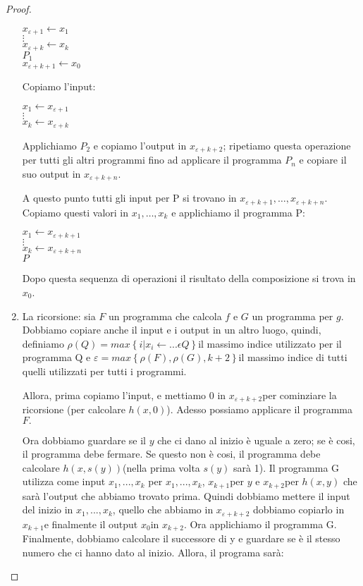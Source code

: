 \begin{proof}
\begin{enumerate}
\begin{mylisting}
$x_{\varepsilon+1}\leftarrow x_{1}$\\
$\vdots$\\
$x_{\varepsilon+k}\leftarrow x_{k}$\\
$P_{1}$\\
$x_{\varepsilon+k+1}\leftarrow x_{0}$
\end{mylisting}

Copiamo l'input:
\begin{mylisting}
$x_{1}\leftarrow x_{\varepsilon+1}$\\
$\vdots$\\
$x_{k}\leftarrow x_{\varepsilon+k}$
\end{mylisting}

Applichiamo $P_{2}$ e copiamo l'output in $x_{\varepsilon+k+2}$;
ripetiamo questa operazione per tutti gli altri programmi fino ad
applicare il programma $P_{n}$ e copiare il suo output in
$x_{\varepsilon+k+n}$.

A questo punto tutti gli input per P si trovano in
$x_{\varepsilon+k+1},\dots,x_{\varepsilon+k+n}$.  Copiamo questi
valori in $x_{1},\dots,x_{k}$ e applichiamo il programma P:

\begin{mylisting}
$x_{1}\leftarrow x_{\varepsilon+k+1}$\\
$\vdots$\\
$x_{k}\leftarrow x_{\varepsilon+k+n}$\\
$P$
\end{mylisting}

Dopo questa sequenza di operazioni il risultato della composizione si
trova in $x_{0}$.

\item La ricorsione: sia $F$ un programma che calcola $f$ e $G$ un
  programma per $g$. Dobbiamo copiare anche il input e i output in un
  altro luogo, quindi, definiamo $\rho(Q)=max\left\{
  i|x_{i}\longleftarrow...\epsilon Q\right\} $il massimo indice
  utilizzato per il programma Q e $\varepsilon=max\left\{
  \rho(F),\rho(G),k+2\right\} $il massimo indice di tutti quelli
  utilizzati per tutti i programmi.

Allora, prima copiamo l'input, e mettiamo 0 in
$x_{\varepsilon+k+2}$per cominziare la ricorsione (per calcolare
$h(x,0)$). Adesso possiamo applicare il programma $F.$

Ora dobbiamo guardare se il $y$ che ci dano al inizio è uguale a zero;
se è cosi, il programma debe fermare. Se questo non è cosi, il
programma debe calcolare $h(x,s(y))$(nella prima volta $s(y)$ sarà
1). Il programma G utilizza come input $x_{1},...,x_{k}$ per
$x_{1},...,x_{k}$, $x_{k+1}$per $y$ e $x_{k+2}$per $h(x,y)$ che sarà
l'output che abbiamo trovato prima. Quindi dobbiamo mettere il input
del inizio in $x_{1},...,x_{k}$, quello che abbiamo in
$x_{\varepsilon+k+2}$ dobbiamo copiarlo in $x_{k+1}$e finalmente il
output $x_{0}$in $x_{k+2}$.  Ora applichiamo il programma
G. Finalmente, dobbiamo calcolare il successore di y e guardare se è
il stesso numero che ci hanno dato al inizio. Allora, il programa
sarà:


\end{enumerate}
\end{proof}
